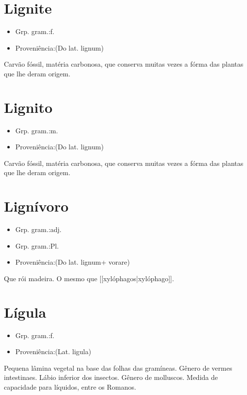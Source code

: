 \section{Lignite}
\begin{itemize}
\item {Grp. gram.:f.}
\end{itemize}
\begin{itemize}
\item {Proveniência:(Do lat. \textunderscore lignum\textunderscore )}
\end{itemize}
Carvão fóssil, matéria carbonosa, que conserva muitas vezes a fórma das plantas que lhe deram origem.
\section{Lignito}
\begin{itemize}
\item {Grp. gram.:m.}
\end{itemize}
\begin{itemize}
\item {Proveniência:(Do lat. \textunderscore lignum\textunderscore )}
\end{itemize}
Carvão fóssil, matéria carbonosa, que conserva muitas vezes a fórma das plantas que lhe deram origem.
\section{Lignívoro}
\begin{itemize}
\item {Grp. gram.:adj.}
\end{itemize}
\begin{itemize}
\item {Grp. gram.:Pl.}
\end{itemize}
\begin{itemize}
\item {Proveniência:(Do lat. \textunderscore lignum\textunderscore  + \textunderscore vorare\textunderscore )}
\end{itemize}
Que rói madeira.
O mesmo que [[xylóphagos|xylóphago]].
\section{Lígula}
\begin{itemize}
\item {Grp. gram.:f.}
\end{itemize}
\begin{itemize}
\item {Proveniência:(Lat. \textunderscore ligula\textunderscore )}
\end{itemize}
Pequena lâmina vegetal na base das folhas das gramíneas.
Gênero de vermes intestinaes.
Lábio inferior dos insectos.
Gênero de molluscos.
Medida de capacidade para líquidos, entre os Romanos.
